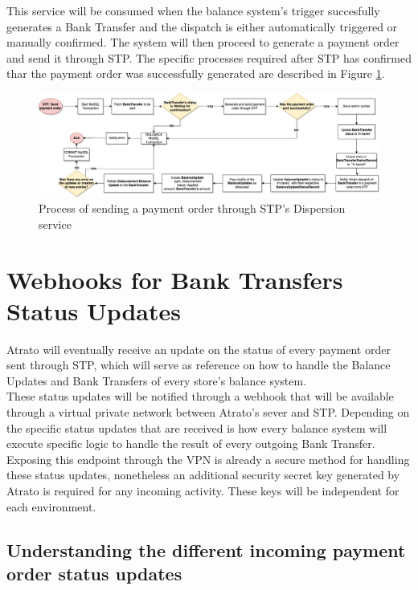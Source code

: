 This service will be consumed when the balance system's trigger succesfully generates a Bank Transfer and the dispatch is either automatically triggered or manually confirmed. The system will then proceed to generate a payment order and send it through STP. The specific processes required after STP has confirmed thar the payment order was successfully generated are described in Figure \ref{fig:stp_send_payment_order}.

\begin{figure}[H]
    \centering
    \includegraphics[scale = 0.3]{assets/diagrams/SendOrder.jpg}
    \caption{Process of sending a payment order through STP's Dispersion service}\label{fig:stp_send_payment_order}
\end{figure}

\section{Webhooks for Bank Transfers Status Updates}

Atrato will eventually receive an update on the status of every payment order sent through STP, which will serve as reference on how to handle the Balance Updates and Bank Transfers of every store’s balance system.\\

These status updates will be notified through a webhook that will be available through a virtual private network between Atrato’s sever and STP. Depending on the specific status updates that are received is how every balance system will execute specific logic to handle the result of every outgoing Bank Transfer.\\

Exposing this endpoint through the VPN is already a secure method for handling these status updates, nonetheless an additional security secret key generated by Atrato is required for any incoming activity. These keys will be independent for each environment.\\

\subsection{Understanding the different incoming payment order status updates}

